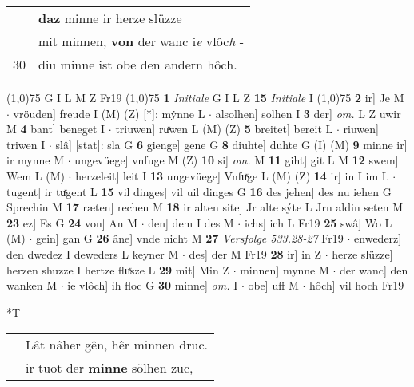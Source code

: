 \documentclass[8pt,a4paper,notitlepage]{article}
\begin{document}
\begin{table}[ht]
\begin{minipage}[t]{0.5\linewidth}
\begin{tabular}{rl}
 & \textbf{daz} minne ir herze slüzze\\ 
 & mit minnen, \textbf{von} der wanc i\textit{e} vlôc\textit{h} -\\ 
30 & diu minne ist obe den andern hôch.\\ 
\end{tabular}
\scriptsize
\line(1,0){75} \newline
G I L M Z Fr19 \newline
\line(1,0){75} \newline
\textbf{1} \textit{Initiale} G I L Z  \textbf{15} \textit{Initiale} I  \newline
\line(1,0){75} \newline
\textbf{2} ir] Je M  $\cdot$ vröuden] freude I (M) (Z) [*]: mẏnne  L  $\cdot$ alsolhen] solhen I \textbf{3} der] \textit{om.} L Z uwir M \textbf{4} bant] beneget I  $\cdot$ triuwen] ruͯwen L (M) (Z) \textbf{5} breitet] bereit L  $\cdot$ riuwen] triwen I  $\cdot$ slâ] [stat]: sla G \textbf{6} gienge] gene G \textbf{8} diuhte] duhte G (I) (M) \textbf{9} minne ir] ir mynne M  $\cdot$ ungevüege] vnfuge M (Z) \textbf{10} si] \textit{om.} M \textbf{11} giht] git L M \textbf{12} swem] Wem L (M)  $\cdot$ herzeleit] leit I \textbf{13} ungevüege] Vnfuͯge L (M) (Z) \textbf{14} ir] in I im L  $\cdot$ tugent] ir tuͯgent L \textbf{15} vil dinges] vil uil dinges G \textbf{16} des jehen] des nu iehen G Sprechin M \textbf{17} ræten] rechen M \textbf{18} ir alten site] Jr alte sýte L Jrn aldin seten M \textbf{23} ez] Es G \textbf{24} von] An M  $\cdot$ den] dem I des M  $\cdot$ ichs] ich L Fr19 \textbf{25} swâ] Wo L (M)  $\cdot$ gein] gan G \textbf{26} âne] vnde nicht M \textbf{27} \textit{Versfolge 533.28-27} Fr19   $\cdot$ enwederz] den dwedez I deweders L keyner M  $\cdot$ des] der M Fr19 \textbf{28} ir] in Z  $\cdot$ herze slüzze] herzen shuzze I hertze fluͯsze L \textbf{29} mit] Min Z  $\cdot$ minnen] mynne M  $\cdot$ der wanc] den wanken M  $\cdot$ ie vlôch] ih floc G \textbf{30} minne] \textit{om.} I  $\cdot$ obe] uff M  $\cdot$ hôch] vil hoch Fr19 \newline
\end{minipage}
\hspace{0.5cm}
\begin{minipage}[t]{0.5\linewidth}
\small
\begin{center}*T
\end{center}
\begin{tabular}{rl}
 & Lât nâher gên, hêr minnen druc.\\ 
 & ir tuot der \textbf{minne} sölhen zuc,\\ 

\end{tabular}
\end{minipage}
\end{table}
\end{document}
